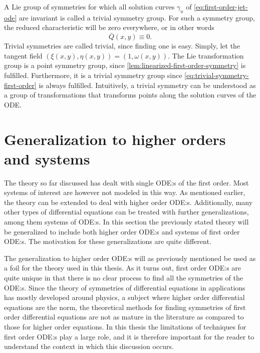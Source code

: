 A Lie group of symmetries for which all solution curves \(\gamma_u\) of \cref{eq:first-order-jet-ode} are invariant is called a trivial symmetry group.
For such a symmetry group, the reduced characteristic will be zero everywhere, or in other words
\begin{equation} \label{eq:trivial-symmetry-first-order}
  \bar{Q}(x, y) \equiv 0.
\end{equation}
Trivial symmetries are called trivial, since finding one is easy.
Simply, let the tangent field \(\left(\xi(x,y), \eta(x,y)\right) = \left(1, \omega(x,y)\right)\).
The Lie transformation group is a point symmetry group, since \cref{lem:linearized-first-order-symmetry} is fulfilled.
Furthermore, it is a trivial symmetry group since \cref{eq:trivial-symmetry-first-order} is always fulfilled.
Intuitively, a trivial symmetry can be understood as a group of transformations that transforms points along the solution curves of the ODE.

\section{Generalization to higher orders and systems}

The theory so far discussed has dealt with single ODE:s of the first order.
Most systems of interest are however not modeled in this way.
As mentioned earlier, the theory can be extended to deal with higher order ODE:s.
Additionally, many other types of differential equations can be treated with further generalizations, among them systems of ODE:s.
In this section the previously stated theory will be generalized to include both higher order ODE:s and systems of first order ODE:s.
The motivation for these generalizations are quite different.

The generalization to higher order ODE:s will as previously mentioned be used as a foil for the theory used in this thesis.
As it turns out, first order ODE:s are quite unique in that there is no clear process to find all the symmetries of the ODE:s.
Since the theory of symmetries of differential equations in applications has mostly developed around physics, a subject where higher order differential equations are the norm, the theoretical methods for finding symmetries of first order differential equations are not as mature in the literature as compared to those for higher order equations.
In this thesis the limitations of techniques for first order ODE:s play a large role, and it is therefore important for the reader to understand the context in which this discussion occurs.


